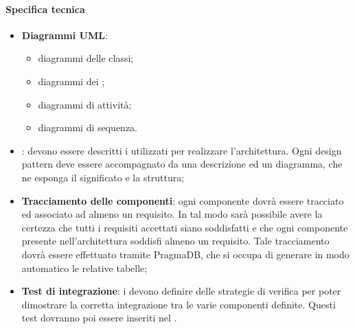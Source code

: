  \paragraph{Specifica tecnica}
 \begin{itemize}
 	\item \textbf{Diagrammi UML}:
 	\begin{itemize}
 		\item diagrammi delle classi;
 		\item diagrammi dei ;
 		\item diagrammi di attività;
 		\item diagrammi di sequenza.
 	\end{itemize}
 	\item \textbf{}: devono essere descritti i  utilizzati per realizzare l'architettura. Ogni design
 	pattern deve essere accompagnato da una descrizione ed un diagramma, che ne esponga il
 	significato e la struttura;
 	\item \textbf{Tracciamento delle componenti}: ogni componente dovrà essere tracciato ed associato
 	ad almeno un requisito. In tal modo sarà possibile avere la certezza che tutti i requisiti
 	accettati siano soddisfatti e che ogni componente presente nell’architettura soddisfi almeno
 	un requisito. Tale tracciamento dovrà essere effettuato tramite PragmaDB, che si occupa
 	di generare in modo automatico le relative tabelle;
 	\item \textbf{Test di integrazione}: i \PJP{} devono definire delle strategie di verifica per poter dimostrare la corretta integrazione tra le varie componenti definite. Questi test dovranno poi essere inseriti nel .
 \end{itemize}

